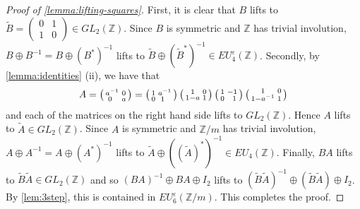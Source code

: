 \documentclass[11pt,a4paper,leqno]{amsart}
\theoremstyle{definition}
\theoremstyle{remark}
\newcommand{\wt}{\widetilde}
\newcommand{\cy}[1]{\Z/{#1}}
\newcommand{\Z}{\mathbb{Z}}
\newcommand{\bZ}{\mathbb Z}
\newcommand{\ep}{\varepsilon}
\newcommand{\sx}{\hphantom{x}}
\newcommand{\EU}{EU^{\varepsilon}}
\begin{document}
\begin{proof}[Proof of \cref{lemma:lifting-squares}]
First, it is clear that $B$ lifts to $\wt B = \left(\begin{smallmatrix} 0 & 1 \\ 1 & 0 \end{smallmatrix}\right) \in GL_2(\Z)$. Since $B$ is symmetric and $\Z$ has trivial involution, $B \oplus B^{-1} = B \oplus (B^*)^{-1}$ lifts to $\wt B \oplus (\wt B^*)^{-1} \in \EU_4(\Z)$.
Secondly, by \cref{lemma:identities} (ii), we have that
\[ A = \left(\begin{smallmatrix} a^{-1} & 0 \\ 0 \sx & a \end{smallmatrix}\right) = \left(\begin{smallmatrix} 1 & a^{-1} \\ 0 & 1\sx \end{smallmatrix}\right)\left(\begin{smallmatrix} 1 & 0 \\ 1-a & 1 \end{smallmatrix}\right)\left(\begin{smallmatrix} 1 & -1 \\ 0 & \sx 1 \end{smallmatrix}\right)\left(\begin{smallmatrix} 1 & 0 \\ 1-a^{-1} & 1 \end{smallmatrix}\right) \]
and each of the matrices on the right hand side lifts to $ GL_2(\Z)$.  Hence $A$ lifts to $\tilde A \in GL_2(\bZ)$. Since $A$ is symmetric and $\cy m$ has trivial involution, $A \oplus A^{-1} = A \oplus (A^*)^{-1}$ lifts to $\tilde A \oplus ((\tilde A)^*)^{-1} \in EU_4(\bZ)$.
Finally, $BA$ lifts to $\wt B \wt A \in GL_2(\Z)$ and so $(BA)^{-1} \oplus BA \oplus I_2$ lifts to $(\wt B \wt A)^{-1} \oplus (\wt B \wt A) \oplus I_2$. By \cref{lem:3step}, this is contained in $EU^\ep_6(\cy m)$.
This completes the proof.
\end{proof}
\end{document}
